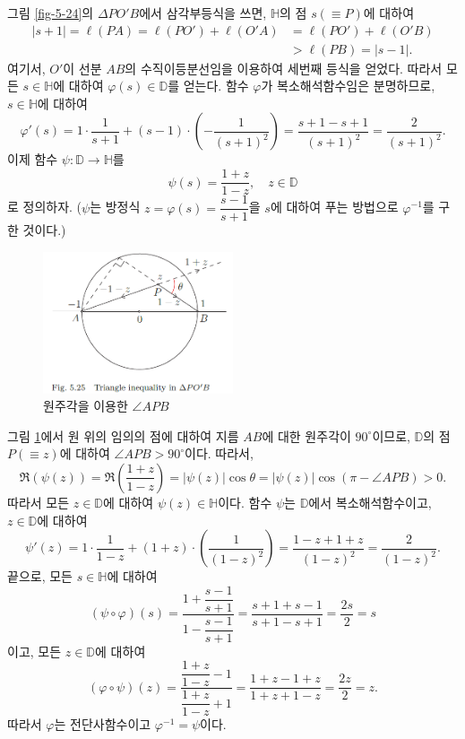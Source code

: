 \begin{itemize}
그림 \ref{fig-5-24}의 $\Delta PO'B$에서 삼각부등식을 쓰면,
$\mathbb H$의 점 $s(\equiv P)$에 대하여
\begin{align*}
|s+1| = \ell(PA) = \ell(PO') + \ell(O'A)
&= \ell(PO') + \ell (O'B) \\
&> \ell(PB) = |s-1|.
\end{align*}
여기서, $O'$이 선분  $AB$의 수직이등분선임을 이용하여
세번째 등식을 얻었다.
따라서 모든 $s\in\mathbb H$에 대하여 $\varphi(s)\in \mathbb D$를 얻는다.
함수 $\varphi$가 복소해석함수임은 분명하므로, $s\in\mathbb H$에  대하여
\[
\varphi'(s) = 1\cdot \dfrac1{s+1} + (s-1)\cdot
\left( - \dfrac1{(s+1)^2} \right) = \dfrac{s+1-s+1}{(s+1)^2}
= \dfrac2{(s+1)^2}.
\]
이제 함수  $\psi: \mathbb D \to \mathbb H$를
\[
\psi(s) = \dfrac{1+z}{1-z}, \quad z\in\mathbb D
\]
로 정의하자.
($\psi$는
방정식 $z= \varphi(s) = \dfrac{s-1}{s+1}$을 $s$에 대하여 푸는 방법으로
$\varphi^{-1}$를 구한 것이다.)

\begin{figure}[h!]
\begin{center}
\includegraphics[width=0.5\textwidth]{./figs/fig-5-25}
\end{center}
\caption{원주각을 이용한 $\angle APB$
}
\label{fig-5-25}
\end{figure}

그림 \ref{fig-5-25}에서 원 위의 임의의 점에 대하여
지름 $AB$에 대한 원주각이 $90^\circ$이므로,
$\mathbb D$의 점 $P(\equiv z)$에 대하여
$\angle APB >90^\circ$이다. 따라서,
\[
\Re(\psi(z)) = \Re\left( \dfrac{1+z}{1-z} \right)
= |\psi(z)| \cos\theta = |\psi(z)| \cos(\pi - \angle APB) >0.
\]
따라서 모든 $z\in \mathbb D$에 대하여 $\psi(z)\in \mathbb H$이다.
함수 $\psi$는 $\mathbb D$에서 복소해석함수이고, $z\in\mathbb D$에 대하여
\[
\psi'(z) = 1\cdot \dfrac1{1-z} + (1+z)\cdot \left(\dfrac1{(1-z)^2}\right)
= \dfrac{1-z+1+z}{(1-z)^2} = \dfrac2{(1-z)^2}.
\]
끝으로, 모든 $s\in\mathbb H$에 대하여
\[
(\psi\circ \varphi)(s) = \dfrac{1+\dfrac{s-1}{s+1}}{1-\dfrac{s-1}{s+1}}
= \dfrac{s+1+s-1}{s+1-s+1} = \dfrac{2s}2 = s
\]
이고, 모든 $z\in\mathbb D$에 대하여 
\[
(\varphi\circ\psi)(z) = \dfrac{\dfrac{1+z}{1-z}-1}{\dfrac{1+z}{1-z}+1}
= \dfrac{1+z-1+z}{1+z+1-z} = \dfrac{2z}2 = z.
\]
따라서 $\varphi$는 전단사함수이고 $\varphi^{-1}=\psi$이다.


\end{itemize}
